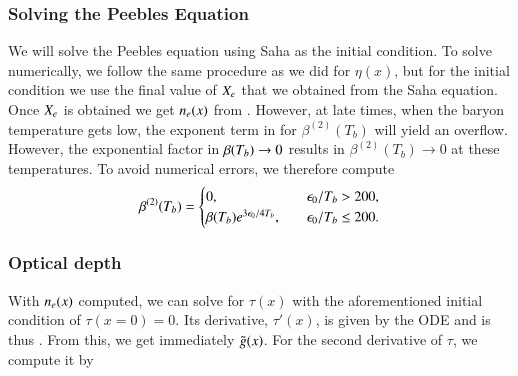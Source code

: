 \subsubsection{Solving the Peebles Equation}\label{sssec:M2:implementations:solving_peebles}
We will solve the Peebles equation using Saha as the initial condition. To solve  numerically, we follow the same procedure as we did for $\eta(x)$, but for the initial condition we use the final value of $X_e$ that we obtained from the Saha equation. Once $X_e$ is obtained we get $n_e(x)$ from . However, at late times, when the baryon temperature gets low, the exponent term in  for $\beta^{(2)}(T_b)$ will yield an overflow. However, the exponential factor in $\beta(T_b)\to0$ results in $\beta^{(2)}(T_b)\to0$ at these temperatures. To avoid numerical errors, we therefore compute 
\begin{equation}
    \beta^{(2)}(T_b) = \begin{cases}
        0,\quad &\epsilon_0/T_b > 200, \\
        \beta(T_b) e^{3\epsilon_0/4T_b},\quad &\epsilon_0/T_b \leq 200.
    \end{cases}
\end{equation} 

\subsubsection{Optical depth} \label{sssec:M2:implementations:optical_depth}
With $n_e(x)$ computed, we can solve  for $\tau(x)$ with the aforementioned initial condition of $\tau(x=0)=0$. Its derivative, $\tau'(x)$, is given by the ODE and is thus . From this, we get immediately $\tilde{g}(x)$. For the second derivative of $\tau$, we compute it by    

